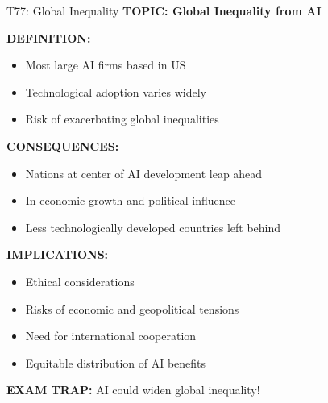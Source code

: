 \documentclass[8pt]{beamer}
\begin{document}
	\begin{frame}{T77: Global Inequality}
		\fontsize{6.5}{7.5}\selectfont
		\textbf{TOPIC: Global Inequality from AI}
		
		\vspace{0.1cm}
		\textbf{DEFINITION:}
		\begin{itemize}
			\item Most large AI firms based in US
			\item Technological adoption varies widely
			\item Risk of exacerbating global inequalities
		\end{itemize}
		
		\vspace{0.1cm}
		\textbf{CONSEQUENCES:}
		\begin{itemize}
			\item Nations at center of AI development leap ahead
			\item In economic growth and political influence
			\item Less technologically developed countries left behind
		\end{itemize}
		
		\vspace{0.1cm}
		\textbf{IMPLICATIONS:}
		\begin{itemize}
			\item Ethical considerations
			\item Risks of economic and geopolitical tensions
			\item Need for international cooperation
			\item Equitable distribution of AI benefits
		\end{itemize}
		
		\textcolor{myred}{\textbf{EXAM TRAP:}} AI could \textcolor{myblue}{widen global inequality}!
	\end{frame}
	
\end{document}
